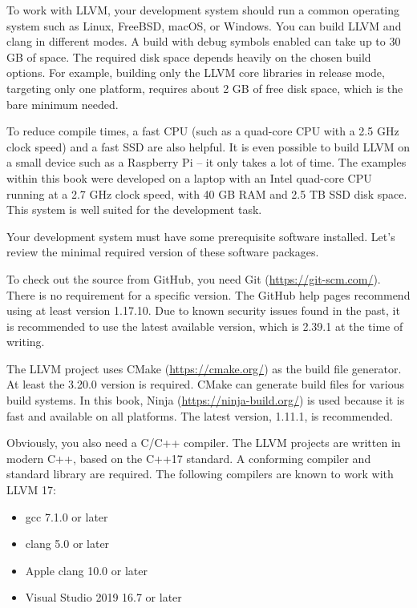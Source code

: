 
To work with LLVM, your development system should run a common operating system such as Linux, FreeBSD, macOS, or Windows. You can build LLVM and clang in different modes. A build with debug symbols enabled can take up to 30 GB of space. The required disk space depends heavily on the chosen build options. For example, building only the LLVM core libraries in release mode, targeting only one platform, requires about 2 GB of free disk space, which is the bare minimum needed.

To reduce compile times, a fast CPU (such as a quad-core CPU with a 2.5 GHz clock speed) and a fast SSD are also helpful. It is even possible to build LLVM on a small device such as a Raspberry Pi – it only takes a lot of time. The examples within this book were developed on a laptop with an Intel quad-core CPU running at a 2.7 GHz clock speed, with 40 GB RAM and 2.5 TB SSD disk space. This system is well suited for the development task.

Your development system must have some prerequisite software installed. Let’s review the minimal required version of these software packages.

To check out the source from GitHub, you need Git (\url{https://git-scm.com/}). There is no requirement for a specific version. The GitHub help pages recommend using at least version 1.17.10. Due to known security issues found in the past, it is recommended to use the latest available version, which is 2.39.1 at the time of writing.

The LLVM project uses CMake (\url{https://cmake.org/}) as the build file generator. At least the 3.20.0 version is required. CMake can generate build files for various build systems. In this book, Ninja (\url{https://ninja-build.org/}) is used because it is fast and available on all platforms. The latest version, 1.11.1, is recommended.

Obviously, you also need a C/C++ compiler. The LLVM projects are written in modern C++, based on the C++17 standard. A conforming compiler and standard library are required. The following compilers are known to work with LLVM 17:

\begin{itemize}
\item 
gcc 7.1.0 or later

\item 
clang 5.0 or later

\item 
Apple clang 10.0 or later

\item 
Visual Studio 2019 16.7 or later
\end{itemize}

